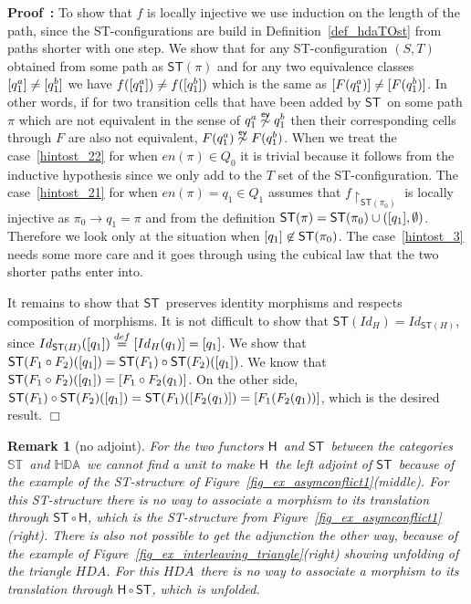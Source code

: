 \documentclass[submission,copyright,creativecommons]{eptcs}
\newtheorem{remark}[theorem]{Remark}
\newenvironment{proof}[1][\!\!\,]{\vspace{1ex}\noindent\textbf{Proof #1: }}{\hfill$\Box$\vspace{2ex}}
\newcounter{case}
\newcommand\HDA{\ensuremath{\mathit{HDA}}}
\newcommand\allST{\ensuremath{\mathbb{ST}}}
\newcommand\allHDA{\ensuremath{\mathbb{HDA}}}
\newcommand\stintoh{\ensuremath{\mathsf{H}}}
\newcommand\hintost{\ensuremath{\mathsf{ST}}}
\newcommand\restrictedToSet[1]{\ensuremath{\!\!\upharpoonright_{#1}}}
\newcommand\finishPath[1]{\ensuremath{\mathit{en}(#1)}}
\newcommand\eventEquivHDAs{\ensuremath{\stackrel{\mathsf{ev}}{\sim}}}
\newcommand{\equivClass}[2][]{\ensuremath{[#2]\ifthenelse{\equal{#1}{}}{}{_{#1}}}}
\newcommand\categoryST{\ensuremath{\allST}}
\newcommand\categoryHDA{\ensuremath{\allHDA}}
\newcommand{\transition}[1]{\ensuremath{\xrightarrow{#1}}}
\begin{document}
\begin{proof}
To show that $f$ is locally injective we use induction on the length of the path, since the ST-configura\-tions are build in Definition~\ref{def_hdaTOst} from paths shorter with one step. We show that for any ST-configuration $(S,T)$ obtained from some path as $\hintost(\pi)$ and for any two equivalence classes $\equivClass{q_{1}^{a}}\neq \equivClass{q_{1}^{b}}$ we have $f(\equivClass{q_{1}^{a}})\neq f(\equivClass{q_{1}^{b}})$ which is the same as $\equivClass{F(q_{1}^{a})}\neq\equivClass{F(q_{1}^{b})}$. In other words, if for two transition cells that have been added by \hintost\ on some path $\pi$ which are not equivalent in the sense of $q_{1}^{a}\not\eventEquivHDAs q_{1}^{b}$ then their corresponding cells through $F$ are also not equivalent, $F(q_{1}^{a})\not\eventEquivHDAs F(q_{1}^{b})$.
When we treat the case~\ref{hintost_22} for when $\finishPath{\pi}\in Q_{0}$ it is trivial because it follows from the inductive hypothesis since we only add to the $T$ set of the ST-configuration.
The case~\ref{hintost_21} for when $\finishPath{\pi}=q_{1}\in Q_{1}$ assumes that $f\restrictedToSet{\hintost(\pi_{0})}$ is locally injective as $\pi_{0}\transition{}q_{1}=\pi$ and from the definition $\hintost(\pi)=\hintost(\pi_{0})\cup(\equivClass{q_{1}},\emptyset)$. Therefore we look only at the situation when $\equivClass{q_{1}}\not\in \hintost(\pi_{0})$.
The case~\ref{hintost_3} needs some more care and it goes through using the cubical law that the two shorter paths enter into.

It remains to show that \hintost\ preserves identity morphisms and respects composition of morphisms.
It is not difficult to show that $\hintost(Id_{H})=Id_{\hintost(H)}$, since $Id_{\hintost(H)}(\equivClass{q_{1}})\stackrel{def}{=}\equivClass{Id_{H}(q_{1})}=\equivClass{q_{1}}$.
We show that $\hintost(F_{1}\circ F_{2})(\equivClass{q_{1}})=\hintost(F_{1})\circ \hintost(F_{2})(\equivClass{q_{1}})$. We know that $\hintost(F_{1}\circ F_{2})(\equivClass{q_{1}})=\equivClass{F_{1}\circ F_{2}(q_{1})}$. On the other side, $\hintost(F_{1})\circ \hintost(F_{2})(\equivClass{q_{1}}) = \hintost(F_{1})(\equivClass{F_{2}(q_{1})}) = \equivClass{F_{1}(F_{2}(q_{1}))}$, which is the desired result.
\end{proof}


\begin{remark}[no adjoint]
For the two functors \stintoh\ and \hintost\ between the categories \categoryST\ and \categoryHDA\ we cannot find a unit to make \stintoh\ the left adjoint of \hintost\ because of the example of the ST-structure of Figure~\ref{fig_ex_asymconflict1}(middle). For this ST-structure there is no way to associate a morphism to its translation through $\hintost\circ\stintoh$, which is the ST-structure from Figure~\ref{fig_ex_asymconflict1}(right). There is also not possible to get the adjunction the other way, because of the example of Figure~\ref{fig_ex_interleaving_triangle}(right) showing unfolding of the triangle \HDA. For this \HDA\ there is no way to associate a morphism to its translation through $\stintoh\circ\hintost$, which is unfolded.
\end{remark}
\end{document}

